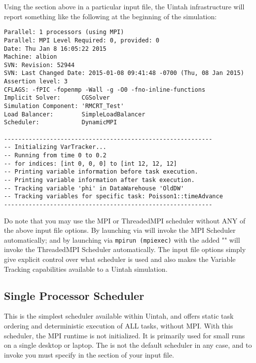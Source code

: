 \noindent Using the  section above in a particular input file,
the Uintah infrastructure will report something like the following at the
beginning of the simulation:

\begin{Verbatim}[fontsize=\footnotesize]
Parallel: 1 processors (using MPI)
Parallel: MPI Level Required: 0, provided: 0
Date: Thu Jan 8 16:05:22 2015
Machine: albion
SVN: Revision: 52944
SVN: Last Changed Date: 2015-01-08 09:41:48 -0700 (Thu, 08 Jan 2015)
Assertion level: 3
CFLAGS: -fPIC -fopenmp -Wall -g -O0 -fno-inline-functions
Implicit Solver:      CGSolver
Simulation Component: 'RMCRT_Test'
Load Balancer:        SimpleLoadBalancer
Scheduler:            DynamicMPI

-----------------------------------------------------------
-- Initializing VarTracker...
-- Running from time 0 to 0.2
-- for indices: [int 0, 0, 0] to [int 12, 12, 12]
-- Printing variable information before task execution.
-- Printing variable information after task execution.
-- Tracking variable 'phi' in DataWarehouse 'OldDW'
-- Tracking variables for specific task: Poisson1::timeAdvance
-----------------------------------------------------------
\end{Verbatim}

Do note that you may use the MPI or ThreadedMPI scheduler without ANY of the 
above input file options. By launching  via  will 
invoke the MPI Scheduler automatically; and by launching  via 
\texttt{mpirun (mpiexec)} with the added "" will invoke the 
ThreadedMPI Scheduler automatically. The input file options simply give 
explicit control over what scheduler is used and also makes the Variable 
Tracking capabilities available to a Uintah simulation.


\subsection{Single Processor Scheduler} \label{Sec:SingleProcessorScheduler}
This is the simplest scheduler available within Uintah, and offers static task
ordering and deterministic execution of ALL tasks, without MPI. With this
scheduler, the MPI runtime is not initialized. It is primarily used for small
runs on a single desktop or laptop. The  is not
the default scheduler in any case, and to invoke you must specify
 in the  section of your input file.


